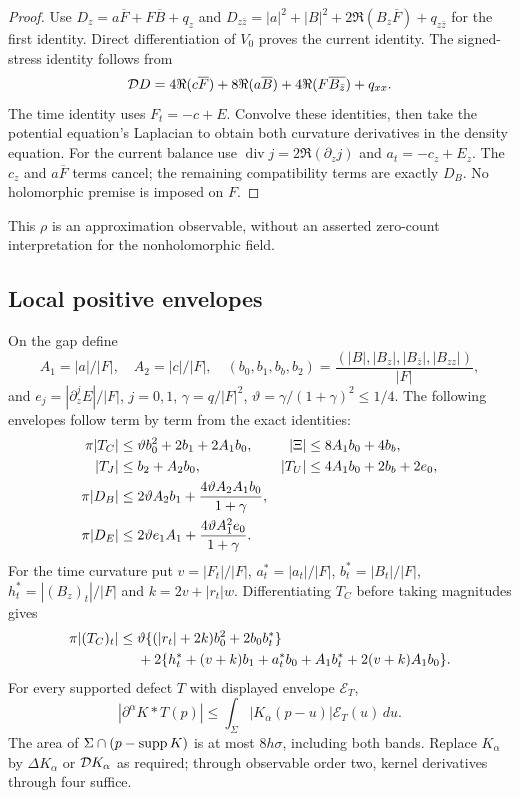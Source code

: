 \begin{proof}
Use $D_z=a\overline F+F\overline B+q_z$ and
$D_{z\bar z}=|a|^2+|B|^2+2\Re(B_z\overline F)+q_{z\bar z}$
for the first identity. Direct differentiation of $V_0$ proves the
current identity. The signed-stress identity follows from
\[
 \mathcal D D=4\Re(c\overline F)+8\Re(a\overline B)
              +4\Re(F\overline{B_{\bar z}})+q_{xx}.
\]
The time identity uses $F_t=-c+E$. Convolve these identities, then take
the potential equation's Laplacian to obtain both curvature derivatives
in the density equation. For the current balance use
$\operatorname{div}j=2\Re(\partial_zj)$ and $a_t=-c_z+E_z$.
The $c_z$ and $a\overline F$ terms cancel; the remaining compatibility
terms are exactly $D_B$. No holomorphic premise is imposed on $F$.
\end{proof}
This $\rho$ is an approximation observable, without an asserted
zero-count interpretation for the nonholomorphic field.

\subsection{Local positive envelopes}
On the gap define
\[
 A_1=|a|/|F|,\quad A_2=|c|/|F|,\quad
 (b_0,b_1,b_b,b_2)=\frac{(|B|,|B_z|,|B_{\bar z}|,|B_{zz}|)}{|F|},
\]
and $e_j=|\partial_z^j E|/|F|$, $j=0,1$,
$\gamma=q/|F|^2$, $\vartheta=\gamma/(1+\gamma)^2\le1/4$.
The following envelopes follow term by term from the exact identities:
\begin{align}
 \pi|T_C|&\le\vartheta b_0^2+2b_1+2A_1b_0,&
 |\Xi|&\le8A_1b_0+4b_b,\notag\\
 |T_J|&\le b_2+A_2b_0,&|T_U|&\le4A_1b_0+2b_b+2e_0,\notag\\
 \pi|D_B|&\le2\vartheta A_2b_1+\frac{4\vartheta A_2A_1b_0}{1+\gamma},\notag\\
 \pi|D_E|&\le2\vartheta e_1A_1+\frac{4\vartheta A_1^2e_0}{1+\gamma}.
 \label{eq:sj-envelopes}
\end{align}
For the time curvature put $v=|F_t|/|F|$,
$a_t^*=|a_t|/|F|$, $b_t^*=|B_t|/|F|$,
$h_t^*=|(B_z)_t|/|F|$ and $k=2v+|r_t|w$. Differentiating $T_C$
before taking magnitudes gives
\begin{align}
 \pi|(T_C)_t|\le{}&\vartheta\{(|r_t|+2k)b_0^2+2b_0b_t^*\}\notag\\
 &+2\{h_t^*+(v+k)b_1+a_t^*b_0+A_1b_t^*
                                  +2(v+k)A_1b_0\}.
 \label{eq:sj-time-curvature}
\end{align}
For every supported defect $T$ with displayed envelope $\mathcal E_T$,
\begin{equation}
 |\partial^\alpha K*T(p)|\le
       \int_\Sigma |K_\alpha(p-u)|\mathcal E_T(u)\,du.
 \label{eq:sj-filter}
\end{equation}
The area of $\Sigma\cap(p-\operatorname{supp} K)$ is at most $8h\sigma$,
including both bands. Replace $K_\alpha$ by $\Delta K_\alpha$ or
$\mathcal D K_\alpha$ as required; through observable order two, kernel
derivatives through four suffice.

